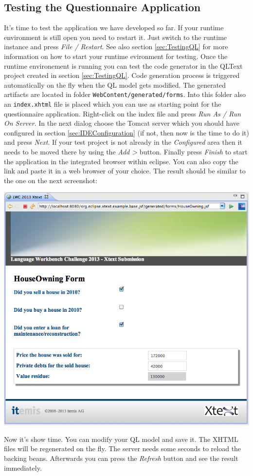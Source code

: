\subsection{Testing the Questionnaire Application}

It's time to test the application we have developed so far. If your runtime
environment is still open you need to restart it. Just switch to the runtime
instance and press \emph{File / Restart}. See also section \ref{sec:TestingQL}
for more information on how to start your runtime evironment for testing. Once
the runtime environement is running you can test the code generator in the
QLText project created in section \ref{sec:TestingQL}. Code generation process
is triggered automatically on the fly when the QL model gets modified. The
generated artifacts are located in folder \texttt{WebContent/generated/forms}.
Into this folder also an \texttt{index.xhtml} file is placed which you can use
as starting point for the questionnaire application. Right-click on the index
file and press \emph{Run As / Run On Server}. In the next dialog choose the
Tomcat server which you should have configured in section
\ref{sec:IDEConfiguration} (if not, then now is the time to do it) and press
\emph{Next}. If your test project is not already in the \emph{Configured} area
then it needs to be moved there by using the \emph{Add >} button. Finally press
\emph{Finish} to start the application in the integrated browser within eclipse.
You can also copy the link and paste it in a web browser of your choice. The
result should be similar to the one on the next screenshot:

\begin{center}
\includegraphics[width=15cm]{./images/chapter02/questionnaireApplication.png}
\end{center}
 
Now it's show time. You can modify your QL model and save it. The XHTML files
will be regenerated on the fly. The server needs some seconds to reload the
backing beans. Afterwards you can press the \emph{Refresh} button and see the
result immediately.
